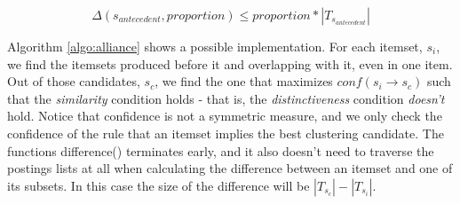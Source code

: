 \documentclass{sig-alternate}
\begin{document}
\begin{equation}\label{eq:maxDiffCnt}\Delta(s_{antecedent},  proportion)
\le proportion *  |T_{s_{antecedent}}|
\end{equation}

Algorithm  \ref{algo:alliance}  shows a possible implementation. For each itemset, $s_i$, we find the itemsets produced before it and overlapping with it, even in one item. Out of those candidates, $s_c$, we find the one that maximizes $conf(s_i \rightarrow s_c)$ such that the \emph{similarity} condition holds - that is, the \emph{distinctiveness} condition \emph{doesn't} hold. Notice that confidence is not a symmetric measure, and we only check the confidence of the rule that an itemset implies the best clustering candidate. 
The functions difference() terminates early, and it also doesn't need to traverse the postings lists at all when calculating the difference between an itemset and one of its subsets. In this case the size of the difference will be $|T_{s_c}| - |T_{s_i}|$.
\end{document}
